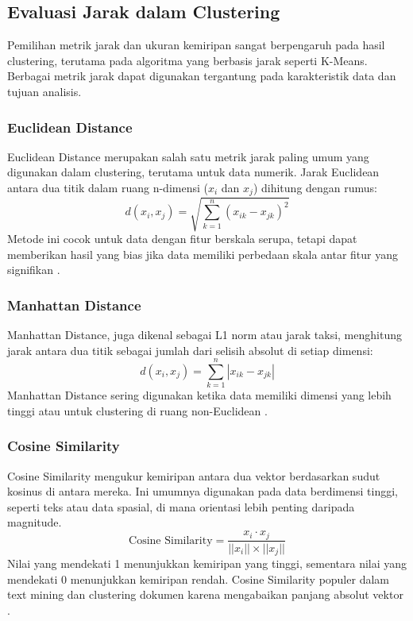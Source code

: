 \subsection{Evaluasi Jarak dalam Clustering}
Pemilihan metrik jarak dan ukuran kemiripan sangat berpengaruh pada hasil clustering, terutama pada algoritma yang berbasis jarak seperti K-Means. Berbagai metrik jarak dapat digunakan tergantung pada karakteristik data dan tujuan analisis.

\subsubsection{Euclidean Distance}
Euclidean Distance merupakan salah satu metrik jarak paling umum yang digunakan dalam clustering, terutama untuk data numerik. Jarak Euclidean antara dua titik dalam ruang n-dimensi ($x_i$ dan $x_j$) dihitung dengan rumus:
\[
d(x_i, x_j) = \sqrt{\sum_{k=1}^{n} (x_{ik} - x_{jk})^2}
\]
Metode ini cocok untuk data dengan fitur berskala serupa, tetapi dapat memberikan hasil yang bias jika data memiliki perbedaan skala antar fitur yang signifikan \cite{JainEuclideanDistance}.

\subsubsection{Manhattan Distance}
Manhattan Distance, juga dikenal sebagai L1 norm atau jarak taksi, menghitung jarak antara dua titik sebagai jumlah dari selisih absolut di setiap dimensi:
\[
d(x_i, x_j) = \sum_{k=1}^{n} |x_{ik} - x_{jk}|
\]
Manhattan Distance sering digunakan ketika data memiliki dimensi yang lebih tinggi atau untuk clustering di ruang non-Euclidean \cite{AggarwalManhattanDistance}.

\subsubsection{Cosine Similarity}
Cosine Similarity mengukur kemiripan antara dua vektor berdasarkan sudut kosinus di antara mereka. Ini umumnya digunakan pada data berdimensi tinggi, seperti teks atau data spasial, di mana orientasi lebih penting daripada magnitude.
\[
\text{Cosine Similarity} = \frac{x_i \cdot x_j}{||x_i|| \times ||x_j||}
\]
Nilai yang mendekati 1 menunjukkan kemiripan yang tinggi, sementara nilai yang mendekati 0 menunjukkan kemiripan rendah. Cosine Similarity populer dalam text mining dan clustering dokumen karena mengabaikan panjang absolut vektor \cite{HuangCosineRadius}.

